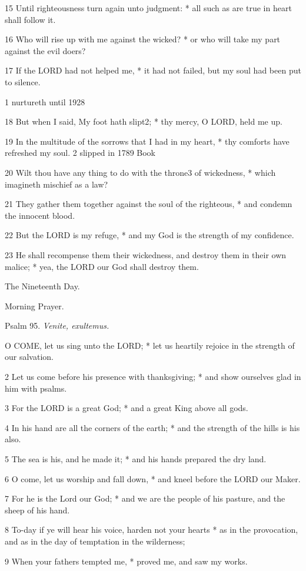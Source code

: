 15 Until righteousness turn again unto judgment: * all
such as are true in heart shall follow it.

16 Who will rise up with me against the wicked? * or
who will take my part against the evil doers?

17 If the LORD had not helped me, * it had not failed,
but my soul had been put to silence.

1 nurtureth until
1928

18 But when I said, My foot hath slipt2; * thy mercy, O LORD,
held me up.

19 In the multitude of the sorrows that I had in my heart,
* thy comforts have refreshed my soul. 2 slipped in
1789 Book

20 Wilt thou have any thing to do with the throne3 of wickedness,
* which imagineth mischief as a law?

21 They gather them together against the soul of the
righteous, * and condemn the innocent blood.

22 But the LORD is my refuge, * and my God is the strength
of my confidence.

23 He shall recompense them their wickedness, and destroy
them in their own malice; * yea, the LORD our God shall destroy them.

The Nineteenth
Day.

Morning
Prayer.

Psalm
95. \emph{Venite, exultemus.}

O
COME, let us sing unto the LORD; * let us heartily rejoice in the strength
of our salvation.

2 Let us come before his presence with thanksgiving;
* and show ourselves glad in him with psalms.

3 For the LORD is a great God; * and a great King above
all gods.

4 In his hand are all the corners of the earth; * and
the strength of the hills is his also.

5 The sea is his, and he made it; * and his hands prepared
the dry land.

6 O come, let us worship and fall down, * and kneel
before the LORD our Maker.

7 For he is the Lord our God; * and we are the people
of his pasture, and the sheep of his hand.

8 To-day if ye will hear his voice, harden not your
hearts * as in the provocation, and as in the day of temptation in the
wilderness;

9 When your fathers tempted me, * proved me, and saw
my works.

